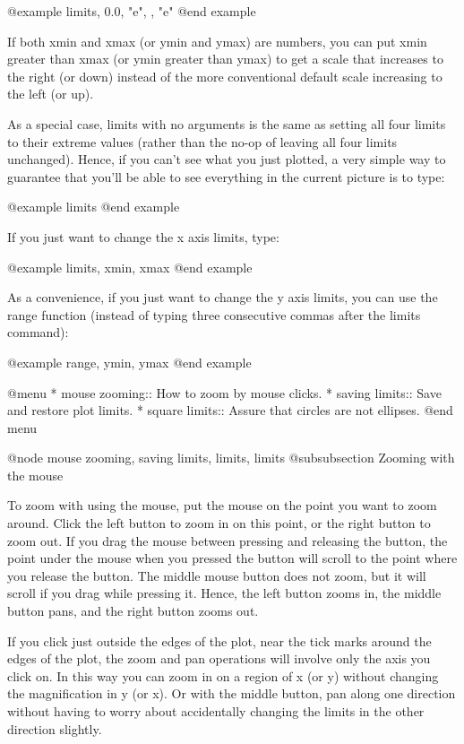 @example
limits, 0.0, "e", , "e"
@end example

If both xmin and xmax (or ymin and ymax) are numbers, you can put xmin
greater than xmax (or ymin greater than ymax) to get a scale that
increases to the right (or down) instead of the more conventional
default scale increasing to the left (or up).

As a special case, limits with no arguments is the same as setting all
four limits to their extreme values (rather than the no-op of leaving
all four limits unchanged).  Hence, if you can't see what you just
plotted, a very simple way to guarantee that you'll be able to see
everything in the current picture is to type:

@example
limits
@end example

If you just want to change the x axis limits, type:

@example
limits, xmin, xmax
@end example

As a convenience, if you just want to change the y axis limits, you
can use the range function (instead of typing three consecutive commas
after the limits command):

@example
range, ymin, ymax
@end example

@menu
* mouse zooming::               How to zoom by mouse clicks.
* saving limits::               Save and restore plot limits.
* square limits::               Assure that circles are not ellipses.
@end menu

@node mouse zooming, saving limits, limits, limits
@subsubsection Zooming with the mouse

To zoom with using the mouse, put the mouse on the point you want to
zoom around.  Click the left button to zoom in on this point, or the
right button to zoom out.  If you drag the mouse between pressing and
releasing the button, the point under the mouse when you pressed the
button will scroll to the point where you release the button.  The
middle mouse button does not zoom, but it will scroll if you drag
while pressing it.  Hence, the left button zooms in, the middle button
pans, and the right button zooms out.

If you click just outside the edges of the plot, near the tick marks
around the edges of the plot, the zoom and pan operations will involve
only the axis you click on.  In this way you can zoom in on a region
of x (or y) without changing the magnification in y (or x).  Or with
the middle button, pan along one direction without having to worry
about accidentally changing the limits in the other direction
slightly.

